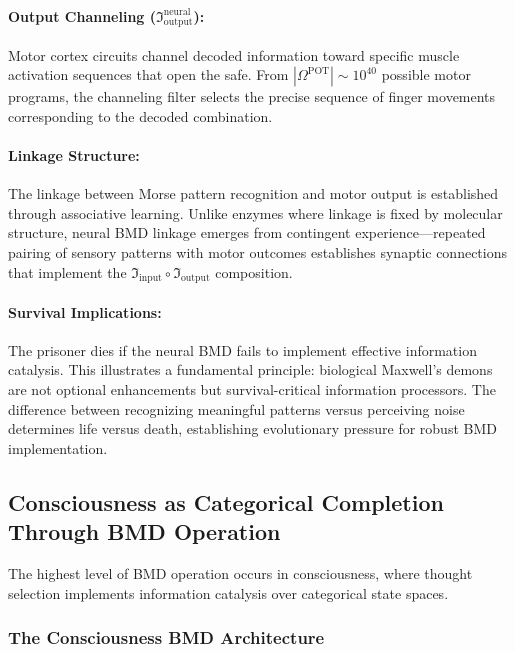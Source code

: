 \paragraph{Output Channeling (\(\Im_{\text{output}}^{\text{neural}}\)):}
Motor cortex circuits channel decoded information toward specific muscle activation sequences that open the safe. From \(|\Omega^{\text{POT}}| \sim 10^{40}\) possible motor programs, the channeling filter selects the precise sequence of finger movements corresponding to the decoded combination.

\paragraph{Linkage Structure:}
The linkage between Morse pattern recognition and motor output is established through associative learning. Unlike enzymes where linkage is fixed by molecular structure, neural BMD linkage emerges from contingent experience—repeated pairing of sensory patterns with motor outcomes establishes synaptic connections that implement the \(\Im_{\text{input}} \circ \Im_{\text{output}}\) composition.

\paragraph{Survival Implications:}
The prisoner dies if the neural BMD fails to implement effective information catalysis. This illustrates a fundamental principle: biological Maxwell's demons are not optional enhancements but survival-critical information processors. The difference between recognizing meaningful patterns versus perceiving noise determines life versus death, establishing evolutionary pressure for robust BMD implementation.

\subsection{Consciousness as Categorical Completion Through BMD Operation}

The highest level of BMD operation occurs in consciousness, where thought selection implements information catalysis over categorical state spaces.

\subsubsection{The Consciousness BMD Architecture}

